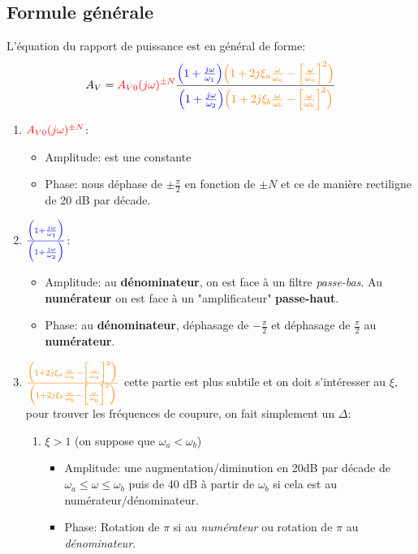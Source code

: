 \documentclass{report}
\begin{document}
\subsection{Formule générale}
L'équation du rapport de puissance est en général de forme:
\begin{equation}
A_V = \textcolor{red}{A_{V0}(j\omega)^{\pm N}}\frac{\textcolor{blue}{\Bigl(1 + \frac{j\omega}{\omega_1}\Bigl)} \textcolor{orange}{\Bigl( 1 + 2 j \xi_a \frac{\omega}{\omega_a} - \Bigl[ \frac{\omega}{\omega_a}\Bigl]^2 \Bigl)}}{\textcolor{blue}{\Bigl(1 + \frac{j\omega}{\omega_2}\Bigl)} \textcolor{orange}{\Bigl( 1 + 2 j \xi_b \frac{\omega}{\omega_b} - \Bigl[ \frac{\omega}{\omega_b}\Bigl]^2 \Bigl)}}
\end{equation}
\newpage
\begin{enumerate}
\item $\textcolor{red}{A_{V0}(j\omega)^{\pm N}}$:
	\begin{itemize}
	\item Amplitude: est une constante
	\item Phase: nous déphase de $\pm \frac{\pi}{2}$ en fonction de $\pm N$ et ce de manière rectiligne de 20 dB par décade.
	\end{itemize}
\item $\textcolor{blue}{\frac{\textcolor{blue}{\Bigl(1 + \frac{j\omega}{\omega_1}\Bigl)}}{\textcolor{blue}{\Bigl(1 + \frac{j\omega}{\omega_2}\Bigl)}}}$:
	\begin{itemize}
	\item Amplitude: au \textbf{dénominateur}, on est face à un filtre \textit{passe-bas}. Au \textbf{numérateur} on est face à un "amplificateur" \textbf{passe-haut}.
	\item Phase: au \textbf{dénominateur}, déphasage de $-\frac{\pi}{2}$ et déphasage de $\frac{\pi}{2}$ au \textbf{numérateur}.
	\end{itemize}
\item $\textcolor{orange}{\frac{\textcolor{orange}{\Bigl( 1 + 2 j \xi_a \frac{\omega}{\omega_a} - \Bigl[ \frac{\omega}{\omega_a}\Bigl]^2 \Bigl)}}{\textcolor{orange}{\Bigl( 1 + 2 j \xi_b \frac{\omega}{\omega_b} - \Bigl[ \frac{\omega}{\omega_b}\Bigl]^2 \Bigl)}}}$ cette partie est plus subtile et on doit s'intéresser au $\xi$, pour trouver les fréquences de coupure, on fait simplement un $\Delta$:
	\begin{enumerate}
		\item $\xi >  1$ (on suppose que $\omega_a < \omega_b$)
		\begin{itemize}
			\item Amplitude: une augmentation/diminution en 20dB par décade de $\omega_a \leq \omega \leq \omega_b$ puis de 40 dB à partir de $\omega_b$ si cela est au numérateur/dénominateur.
			\item Phase: Rotation de $\pi$ si au \textit{numérateur} ou rotation de $\pi$ au \textit{dénominateur}.
		\end{itemize}
		

\end{enumerate}
\end{enumerate}
\end{document}
